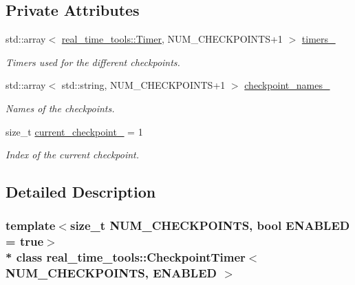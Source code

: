 \subsection*{Private Attributes}
\begin{DoxyCompactItemize}
\item 
std\+::array$<$ \hyperlink{classreal__time__tools_1_1Timer}{real\+\_\+time\+\_\+tools\+::\+Timer}, N\+U\+M\+\_\+\+C\+H\+E\+C\+K\+P\+O\+I\+N\+TS+1 $>$ \hyperlink{classreal__time__tools_1_1CheckpointTimer_a0abbead69aaf780b649f6af01f50cc62}{timers\+\_\+}
\begin{DoxyCompactList}\small\item\em Timers used for the different checkpoints. \end{DoxyCompactList}\item 
std\+::array$<$ std\+::string, N\+U\+M\+\_\+\+C\+H\+E\+C\+K\+P\+O\+I\+N\+TS+1 $>$ \hyperlink{classreal__time__tools_1_1CheckpointTimer_afbb3abc9e62174d6046f6abb294a120f}{checkpoint\+\_\+names\+\_\+}\hypertarget{classreal__time__tools_1_1CheckpointTimer_afbb3abc9e62174d6046f6abb294a120f}{}\label{classreal__time__tools_1_1CheckpointTimer_afbb3abc9e62174d6046f6abb294a120f}

\begin{DoxyCompactList}\small\item\em Names of the checkpoints. \end{DoxyCompactList}\item 
size\+\_\+t \hyperlink{classreal__time__tools_1_1CheckpointTimer_a07ae61ac85e755629625cc32416f2631}{current\+\_\+checkpoint\+\_\+} = 1\hypertarget{classreal__time__tools_1_1CheckpointTimer_a07ae61ac85e755629625cc32416f2631}{}\label{classreal__time__tools_1_1CheckpointTimer_a07ae61ac85e755629625cc32416f2631}

\begin{DoxyCompactList}\small\item\em Index of the current checkpoint. \end{DoxyCompactList}\end{DoxyCompactItemize}


\subsection{Detailed Description}
\subsubsection*{template$<$size\+\_\+t N\+U\+M\+\_\+\+C\+H\+E\+C\+K\+P\+O\+I\+N\+TS, bool E\+N\+A\+B\+L\+ED = true$>$\\*
class real\+\_\+time\+\_\+tools\+::\+Checkpoint\+Timer$<$ N\+U\+M\+\_\+\+C\+H\+E\+C\+K\+P\+O\+I\+N\+T\+S, E\+N\+A\+B\+L\+E\+D $>$}

